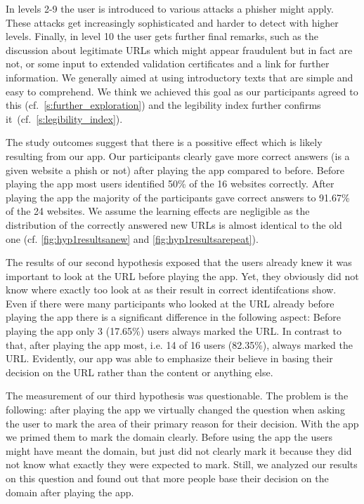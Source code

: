 In levels 2-9 the user is introduced to various attacks a phisher might apply.
These attacks get increasingly sophisticated and harder to detect with higher levels.
Finally, in level 10 the user gets further final remarks, such as the discussion about legitimate URLs which might appear fraudulent but in fact are not, or some input to extended validation certificates and a link for further information.
We generally aimed at using introductory texts that are simple and easy to comprehend.
We think we achieved this goal as our participants agreed to this (cf.~\autoref{s:further_exploration}) and the legibility index further confirms it~(cf.~\autoref{s:legibility_index}).

The study outcomes suggest that there is a possitive effect which is likely resulting from our app.
Our participants clearly gave more correct answers (is a given website a phish or not) after playing the app compared to before.
Before playing the app most users identified 50\% of the 16 websites correctly.
After playing the app the majority of the participants gave correct answers to 91.67\% of the 24 websites.
We assume the learning effects are negligible as the distribution of the correctly answered new URLs is almost identical to the old one (cf. \autoref{fig:hyp1resultsanew} and \autoref{fig:hyp1resultsarepeat}).

The results of our second hypothesis exposed that the users already knew it was important to look at the URL before playing the app.
Yet, they obviously did not know where exactly too look at as their result in correct identifcations show.
Even if there were many participants who looked at the URL already before playing the app there is a significant difference in the following aspect:
Before playing the app only 3 (17.65\%) users always marked the URL.
In contrast to that, after playing the app most, i.e. 14 of 16 users (82.35\%), always marked the URL.
Evidently, our app was able to emphasize their believe in basing their decision on the URL rather than the content or anything else.

The measurement of our third hypothesis was questionable.
The problem is the following: after playing the app we virtually changed the question when asking the user to mark the area of their primary reason for their decision.
With the app we primed them to mark the domain clearly.
Before using the app the users might have meant the domain, but just did not clearly mark it because they did not know what exactly they were expected to mark.
Still, we analyzed our results on this question and found out that more people base their decision on the domain after playing the app.

